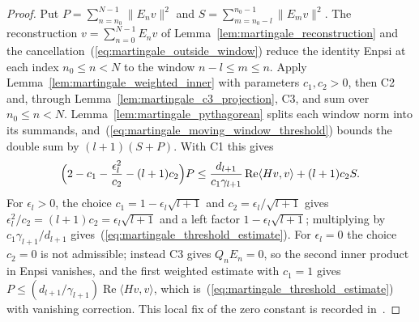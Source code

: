 \begin{proof}\leanok
    Put $P=\sum_{n=n_0}^{N-1}\lVert E_nv\rVert^2$ and
    $S=\sum_{m=n_0-l}^{n_0-1}\lVert E_mv\rVert^2$. The reconstruction
    $v=\sum_{n=0}^{N-1}E_nv$ of Lemma~\ref{lem:martingale_reconstruction} and the
    cancellation~(\ref{eq:martingale_outside_window}) reduce the identity
    \textup{Enpsi} at each index $n_0\le n<N$ to the window $n-l\le m\le n$. Apply
    Lemma~\ref{lem:martingale_weighted_inner} with parameters $c_1,c_2>0$, then C2 and,
    through Lemma~\ref{lem:martingale_c3_projection}, C3, and sum over
    $n_0\le n<N$. Lemma~\ref{lem:martingale_pythagorean} splits each window norm into
    its summands, and~(\ref{eq:martingale_moving_window_threshold}) bounds the double
    sum by $(l+1)(S+P)$. With C1 this gives
    \begin{align*}
        \Bigl(2-c_1-\frac{\epsilon_l^2}{c_2}-(l+1)c_2\Bigr)P
        \le\frac{d_{l+1}}{c_1\gamma_{l+1}}\operatorname{Re}\langle Hv,v\rangle+(l+1)c_2S.
    \end{align*}
    For $\epsilon_l>0$, the choice $c_1=1-\epsilon_l\sqrt{l+1}$ and
    $c_2=\epsilon_l/\sqrt{l+1}$ gives $\epsilon_l^2/c_2=(l+1)c_2=\epsilon_l\sqrt{l+1}$
    and a left factor $1-\epsilon_l\sqrt{l+1}$; multiplying by
    $c_1\gamma_{l+1}/d_{l+1}$ gives~(\ref{eq:martingale_threshold_estimate}). For
    $\epsilon_l=0$ the choice $c_2=0$ is not admissible; instead C3 gives $Q_nE_n=0$, so
    the second inner product in \textup{Enpsi} vanishes, and the first weighted estimate
    with $c_1=1$ gives $P\le(d_{l+1}/\gamma_{l+1})\operatorname{Re}\langle Hv,v\rangle$,
    which is~(\ref{eq:martingale_threshold_estimate}) with vanishing correction. This
    local fix of the zero constant is recorded
    in~\cite{gap:nachtergaele96_theorem_2_1_lower_endpoint}.
\end{proof}

